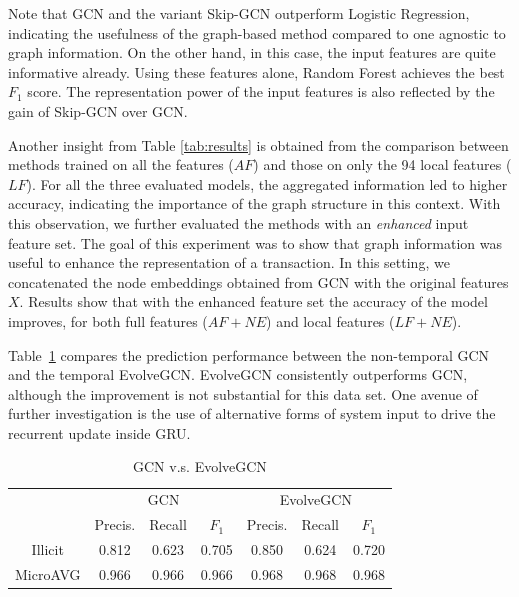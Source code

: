 \documentclass[sigconf,submission]{acmart}
\begin{document}
Note that GCN and the variant Skip-GCN outperform Logistic Regression, indicating the usefulness of the graph-based method compared to one agnostic to graph information. On the other hand, in this case, the input features are quite informative already.
Using these features alone, Random Forest achieves the best $F_1$ score. The representation power of the input features is also reflected by the gain of Skip-GCN over GCN.

Another insight from Table \ref{tab:results} is obtained from the comparison between methods trained on all the features ($AF$) and those on only the 94 local features ($LF$). For all the three evaluated models, the aggregated information led to higher accuracy, indicating the importance of the graph structure in this context. With this observation, we further evaluated the methods with an \textit{enhanced} input feature set. The goal of this experiment was to show that graph information was useful to enhance the representation of a transaction. In this setting, we concatenated the node embeddings obtained from GCN with the original features $X$. Results show that with the enhanced feature set the accuracy of the model improves, for both full features ($AF+NE$) and local features ($LF+NE$).

Table~\ref{tab:evolvegcn} compares the prediction performance between the non-temporal GCN and the temporal EvolveGCN. EvolveGCN consistently outperforms GCN, although the improvement is not substantial for this data set. One avenue of further investigation is the use of alternative forms of system input to drive the recurrent update inside GRU.

\begin{table}[ht]
\centering
\caption{GCN v.s. EvolveGCN}
\label{tab:evolvegcn}
\begin{tabular}{|c|ccc|ccc|}
\hline
& \multicolumn{3}{c|}{GCN} & \multicolumn{3}{c|}{EvolveGCN}\\
& Precis. & Recall & $F_1$ & Precis. & Recall & $F_1$\\
\hline
Illicit  & 0.812 & 0.623 & 0.705 & 0.850 & 0.624 & 0.720\\
MicroAVG & 0.966 & 0.966 & 0.966 & 0.968 & 0.968 & 0.968\\
\hline
\end{tabular}
\end{table}
\end{document}
